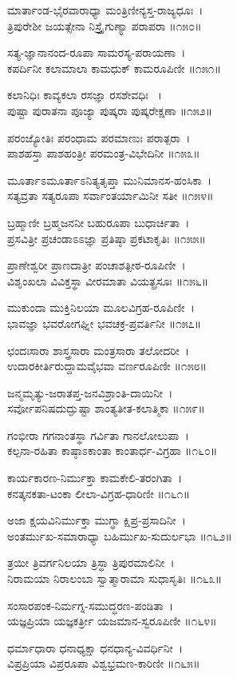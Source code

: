 ಮಾರ್ತಾಂಡ-ಭೈರವಾರಾಧ್ಯಾ ಮಂತ್ರಿಣೀನ್ಯಸ್ತ-ರಾಜ್ಯಧೂಃ~।\\
ತ್ರಿಪುರೇಶೀ ಜಯತ್ಸೇನಾ ನಿಸ್ತ್ರೈಗುಣ್ಯಾ ಪರಾಪರಾ ॥೧೫೦॥

ಸತ್ಯ-ಜ್ಞಾನಾನಂದ-ರೂಪಾ ಸಾಮರಸ್ಯ-ಪರಾಯಣಾ~।\\
ಕಪರ್ದಿನೀ ಕಲಾಮಾಲಾ ಕಾಮಧುಕ್ ಕಾಮರೂಪಿಣೀ ॥೧೫೧॥

ಕಲಾನಿಧಿಃ ಕಾವ್ಯಕಲಾ ರಸಜ್ಞಾ ರಸಶೇವಧಿಃ ~।\\
ಪುಷ್ಟಾ ಪುರಾತನಾ ಪೂಜ್ಯಾ ಪುಷ್ಕರಾ ಪುಷ್ಕರೇಕ್ಷಣಾ ॥೧೫೨॥

ಪರಂಜ್ಯೋತಿಃ ಪರಂಧಾಮ ಪರಮಾಣುಃ ಪರಾತ್ಪರಾ~।\\
ಪಾಶಹಸ್ತಾ ಪಾಶಹಂತ್ರೀ ಪರಮಂತ್ರ-ವಿಭೇದಿನೀ ॥೧೫೩॥

ಮೂರ್ತಾಽಮೂರ್ತಾಽನಿತ್ಯತೃಪ್ತಾ ಮುನಿಮಾನಸ-ಹಂಸಿಕಾ~।\\
ಸತ್ಯವ್ರತಾ ಸತ್ಯರೂಪಾ ಸರ್ವಾಂತರ್ಯಾಮಿನೀ ಸತೀ ॥೧೫೪॥

ಬ್ರಹ್ಮಾಣೀ ಬ್ರಹ್ಮಜನನೀ ಬಹುರೂಪಾ ಬುಧಾರ್ಚಿತಾ~।\\
ಪ್ರಸವಿತ್ರೀ ಪ್ರಚಂಡಾಽಽಜ್ಞಾ ಪ್ರತಿಷ್ಠಾ ಪ್ರಕಟಾಕೃತಿಃ ॥೧೫೫॥

ಪ್ರಾಣೇಶ್ವರೀ ಪ್ರಾಣದಾತ್ರೀ ಪಂಚಾಶತ್ಪೀಠ-ರೂಪಿಣೀ~।\\
ವಿಶೃಂಖಲಾ ವಿವಿಕ್ತಸ್ಥಾ ವೀರಮಾತಾ ವಿಯತ್ಪ್ರಸೂಃ ॥೧೫೬॥

ಮುಕುಂದಾ ಮುಕ್ತಿನಿಲಯಾ ಮೂಲವಿಗ್ರಹ-ರೂಪಿಣೀ~।\\
ಭಾವಜ್ಞಾ ಭವರೋಗಘ್ನೀ ಭವಚಕ್ರ-ಪ್ರವರ್ತಿನೀ ॥೧೫೭॥

ಛಂದಃಸಾರಾ ಶಾಸ್ತ್ರಸಾರಾ ಮಂತ್ರಸಾರಾ ತಲೋದರೀ~।\\
ಉದಾರಕೀರ್ತಿರುದ್ದಾಮವೈಭವಾ ವರ್ಣರೂಪಿಣೀ ॥೧೫೮॥

ಜನ್ಮಮೃತ್ಯು-ಜರಾತಪ್ತ-ಜನವಿಶ್ರಾಂತಿ-ದಾಯಿನೀ~।\\
ಸರ್ವೋಪನಿಷದುದ್ಘುಷ್ಟಾ ಶಾಂತ್ಯತೀತ-ಕಲಾತ್ಮಿಕಾ ॥೧೫೯॥

ಗಂಭೀರಾ ಗಗನಾಂತಸ್ಥಾ ಗರ್ವಿತಾ ಗಾನಲೋಲುಪಾ~।\\
ಕಲ್ಪನಾ-ರಹಿತಾ ಕಾಷ್ಠಾಽಕಾಂತಾ ಕಾಂತಾರ್ಧ-ವಿಗ್ರಹಾ ॥೧೬೦॥

ಕಾರ್ಯಕಾರಣ-ನಿರ್ಮುಕ್ತಾ ಕಾಮಕೇಲಿ-ತರಂಗಿತಾ~।\\
ಕನತ್ಕನಕತಾ-ಟಂಕಾ ಲೀಲಾ-ವಿಗ್ರಹ-ಧಾರಿಣೀ ॥೧೬೧॥

ಅಜಾ ಕ್ಷಯವಿನಿರ್ಮುಕ್ತಾ ಮುಗ್ಧಾ ಕ್ಷಿಪ್ರ-ಪ್ರಸಾದಿನೀ~।\\
ಅಂತರ್ಮುಖ-ಸಮಾರಾಧ್ಯಾ ಬಹಿರ್ಮುಖ-ಸುದುರ್ಲಭಾ ॥೧೬೨॥

ತ್ರಯೀ ತ್ರಿವರ್ಗನಿಲಯಾ ತ್ರಿಸ್ಥಾ ತ್ರಿಪುರಮಾಲಿನೀ~।\\
ನಿರಾಮಯಾ ನಿರಾಲಂಬಾ ಸ್ವಾತ್ಮಾರಾಮಾ ಸುಧಾಸೃತಿಃ ॥೧೬೩॥

ಸಂಸಾರಪಂಕ-ನಿರ್ಮಗ್ನ-ಸಮುದ್ಧರಣ-ಪಂಡಿತಾ~।\\
ಯಜ್ಞಪ್ರಿಯಾ ಯಜ್ಞಕರ್ತ್ರೀ ಯಜಮಾನ-ಸ್ವರೂಪಿಣೀ ॥೧೬೪॥

ಧರ್ಮಾಧಾರಾ ಧನಾಧ್ಯಕ್ಷಾ ಧನಧಾನ್ಯ-ವಿವರ್ಧಿನೀ~।\\
ವಿಪ್ರಪ್ರಿಯಾ ವಿಪ್ರರೂಪಾ ವಿಶ್ವಭ್ರಮಣ-ಕಾರಿಣೀ ॥೧೬೫॥

